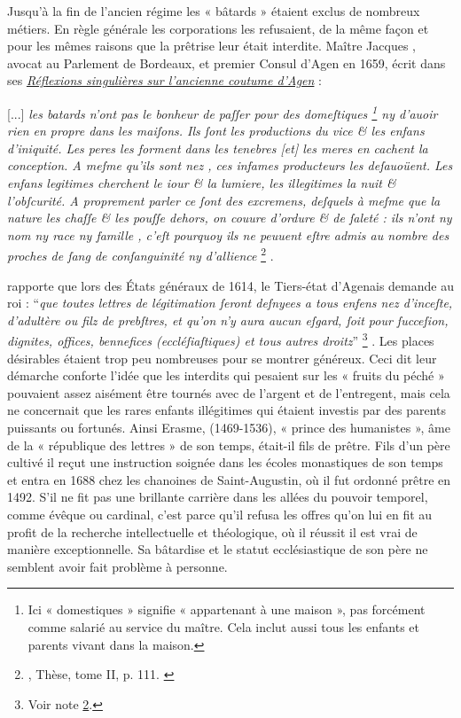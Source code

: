  Jusqu'à la fin de l'ancien régime les « bâtards » étaient exclus de nombreux métiers. En règle générale les corporations les refusaient, de la même façon et pour les mêmes raisons que la prêtrise leur était interdite. Maître Jacques , avocat au Parlement de Bordeaux, et premier Consul d'Agen en 1659, écrit dans ses \href{http://www.babordnum.fr/files/original/859d36685f2d7b2f871c648ea08bd103.pdf}{\emph{Réflexions singulières sur l'ancienne coutume d'Agen}}  :
%
\begin{displayquote}

{[...] \emph{les batards n'ont pas le bonheur de paſſer pour des domeſtiques%
\footnote{Ici « domestiques » signifie « appartenant à une maison », pas forcément comme salarié au service du maître. Cela inclut aussi tous les enfants et parents vivant dans la maison.} 
ny d'auoir rien en propre dans les maiſons. Ils ſont les productions du vice \& les enfans d'iniquité. Les peres les forment dans les tenebres \emph{[et]} les meres en cachent la conception. A meſme qu'ils sont nez , ces infames producteurs les deſauoüent. Les enfans legitimes cherchent le iour \& la lumiere, les illegitimes la nuit \& l'obſcurité. A proprement parler ce ſont des excremens, deſquels à meſme que la nature les chaſſe \& les pouſſe dehors, on couure d'ordure \& de ſaleté : ils n'ont ny nom ny race ny famille , c'eſt pourquoy ils ne peuuent eſtre admis au nombre des proches de ſang de conſanguinité ny d'allience}}%
\footnote{, Thèse, tome II, p. 111.%
\label{notecapul111}}%
.

\end{displayquote}


  rapporte que lors des États généraux de 1614, le Tiers-état d'Agenais demande au roi : \enquote{\emph{que toutes lettres de légitimation ſeront deſnyees a tous enfens nez d'inceſte, d'adultère ou filz de prebſtres, et qu'on n'y aura aucun eſgard, ſoit pour ſucceſion, dignites, offices, bennefices (eccléſiaſtiques) et tous autres droitz}}%
\footnote{%
Voir note \ref{notecapul111}.}%
. Les places désirables étaient trop peu nombreuses pour se montrer généreux. Ceci dit leur démarche conforte l'idée que les interdits qui pesaient sur les « fruits du péché » pouvaient assez aisément être tournés avec de l'argent et de l'entregent, mais cela ne concernait que les rares enfants illégitimes qui étaient investis par des parents puissants ou fortunés. Ainsi Erasme, (1469-1536), « prince des humanistes », âme de la « république des lettres » de son temps, était-il fils de prêtre. Fils d'un père cultivé il reçut une instruction soignée dans les écoles monastiques de son temps et entra en 1688 chez les chanoines de Saint-Augustin, où il fut ordonné prêtre en 1492. S'il ne fit pas une brillante carrière dans les allées du pouvoir temporel, comme évêque ou cardinal, c'est parce qu'il refusa les offres qu'on lui en fit au profit de la recherche intellectuelle et théologique, où il réussit il est vrai de manière exceptionnelle. Sa bâtardise et le statut ecclésiastique de son père ne semblent avoir fait problème à personne.

